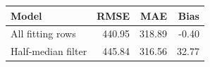 \begin{tabular}{lrrr}
\toprule
Model & RMSE & MAE & Bias \\
\midrule
All fitting rows & 440.95 & 318.89 & -0.40 \\
Half-median filter & 445.84 & 316.56 & 32.77 \\
\bottomrule
\end{tabular}
